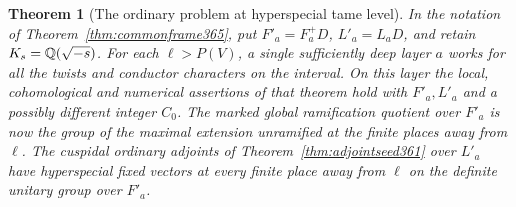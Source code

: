 \documentclass[a4paper,11pt]{article}
\newtheorem{theorem}[proposition]{Theorem}
\theoremstyle{definition}
\theoremstyle{remark}
\numberwithin{equation}{section}
\begin{document}
\begin{theorem}[The ordinary problem at hyperspecial tame level]\leavevmode
\label{thm:hyperspecialframe404}
In the notation of Theorem~\ref{thm:commonframe365}, put
\(F'_a=F_a^+D\), \(L'_a=L_aD\), and retain
\(K_s=\mathbb Q(\sqrt{-s})\). For each \(\ell>P(V)\), a single sufficiently
deep layer \(a\) works for all the twists and conductor characters
on the interval. On this layer the local, cohomological and
numerical assertions of that theorem hold with \(F'_a,L'_a\)
and a possibly different integer \(C_0\). The marked global
ramification quotient over \(F'_a\) is now the group of the
maximal extension unramified at the finite places away from
\(\ell\). The cuspidal ordinary adjoints of
Theorem~\ref{thm:adjointseed361} over \(L'_a\) have hyperspecial
fixed vectors at every finite place away from \(\ell\) on the
definite unitary group over \(F'_a\).
\end{theorem}
\end{document}
